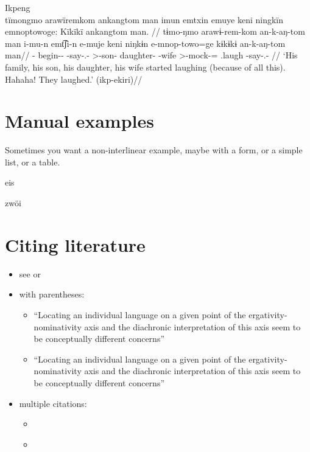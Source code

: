 \documentclass{article}
\begin{document}
\ex  Ikpeng  \\\label{ekiri-14}
\begingl \glpreamble tïmongmo arawïremkom ankangtom man imun emtxin emuye keni ningkïn emnoptowoge: Kïkïkï ankangtom man. //
\gla tɨmo-ŋmo arawɨ-rem-kom an-k-aŋ-tom man i-mu-n emt͡ʃi-n e-muje keni niŋkɨn e-mnop-towo=ge kɨkɨkɨ an-k-aŋ-tom man//
\glb {}- begin-- -say-.-  >-son- daughter- -wife   >-mock-= .laugh -say-.- //
\glft ‘His family, his son, his daughter, his wife started laughing (because of all this). Hahaha! They laughed.’ (ikp-ekiri)//
\endgl
\xe

\section{\texorpdfstring{Manual
examples\label{manual-examples}}{Manual examples}}

Sometimes you want a non-interlinear example, maybe with a form, or a
simple list, or a table.

\ex\label{manex1} eis \xe

\ex\label{manex2} zwöi \xe

\section{\texorpdfstring{Citing literature
\label{sec:sources}}{Citing literature }}

\begin{itemize}
\tightlist
\item
  see \textcites{alvarez1998split} or
  \textcites[133-134]{alvarez1998split}
\item
  with parentheses:

  \begin{itemize}
  \tightlist
  \item
    ``Locating an individual language on a given point of the
    ergativity-nominativity axis and the diachronic interpretation of
    this axis seem to be conceptually different concerns''
    \parencites{alvarez1998split}
  \item
    ``Locating an individual language on a given point of the
    ergativity-nominativity axis and the diachronic interpretation of
    this axis seem to be conceptually different concerns''
    \parencites[71]{alvarez1998split}
  \end{itemize}
\item
  multiple citations:

  \begin{itemize}
  \tightlist
  \item
    \textcites[133-134]{alvarez1998split}[218]{triomeira1999}
  \item
    \parencites[133-134]{alvarez1998split}[218]{triomeira1999}
  \end{itemize}
\end{itemize}

\printbibliography
\end{document}
